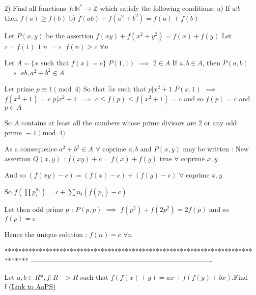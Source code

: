 \begin{solution}
	\begin{tcolorbox}2) Find all functions $f:\mathbb{N}^* \to \mathbb{Z}$ which satisfy the following conditions: 
a) If $a \vdots b$ then $f(a) \geq f(b)$
b) $f(ab)+f\left ( a^2+b^2 \right ) = f(a)+f(b)$\end{tcolorbox}
Let $P(x,y)$ be the assertion $f(xy)+f(x^2+y^2)=f(x)+f(y)$
Let $c=f(1)$
$1|n$ $\implies$ $f(n)\ge c$ $\forall n$

Let $A=\{x$ such that $f(x)=c\}$
$P(1,1)$ $\implies$ $2\in A$
If $a,b\in A$, then $P(a,b)$ $\implies$ $ab,a^2+b^2\in A$

Let prime $p\equiv 1\pmod 4$ So that $\exists x$ such that $p|x^2+1$
$P(x,1)$ $\implies$ $f(x^2+1)=c$
$p|x^2+1$ $\implies$ $c\le f(p)\le f(x^2+1)=c$ and so $f(p)=c$ and $p\in A$

So $A$ contains at least all the numbers whose prime divisors are $2$ or any odd prime $\equiv 1\pmod 4$

As a consequence $a^2+b^2\in A$ $\forall$ coprime $a,b$ and $P(x,y)$ may be written :
New assertion $Q(x,y)$ : $f(xy)+c=f(x)+f(y)$ true $\forall$ coprime $x,y$

And so $(f(xy)-c)=(f(x)-c)+(f(y)-c)$ $\forall$ coprime $x,y$

So $f(\prod p_i^{n_i})=c+\sum n_i(f(p_i)-c)$

Let then odd prime $p$ : $P(p,p)$ $\implies$ $f(p^2)+f(2p^2)=2f(p)$ and so $f(p)=c$ 

Hence the unique solution : $\boxed{f(n)=c}$ $\forall n$
\end{solution}
*******************************************************************************
-------------------------------------------------------------------------------

\begin{problem}
	Let $a,b \in R*,f:R->R$ such that $f(f(x)+y)=ax+f(f(y)+bx)$.Find f
	\flushright \href{https://artofproblemsolving.com/community/c6h565012}{(Link to AoPS)}
\end{problem}



